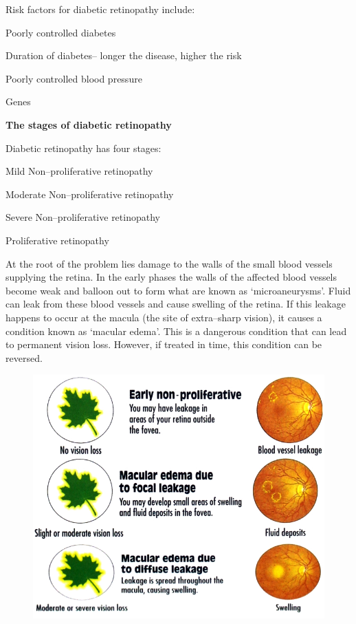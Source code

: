 {Risk factors for diabetic retinopathy include:

\item Poorly controlled diabetes

 \item Duration of diabetes– longer the disease, higher the risk

 \item Poorly controlled blood pressure

 \item Genes

\textbf{The stages of diabetic retinopathy}

Diabetic retinopathy has four stages:

\item Mild Non–proliferative retinopathy

 \item Moderate Non–proliferative retinopathy

 \item Severe Non–proliferative retinopathy

 \item Proliferative retinopathy

At the root of the problem lies damage to the walls of the small blood vessels supplying the retina. In the early phases the walls of the affected blood vessels become weak and balloon out to form what are known as ‘microaneurysms’. Fluid can leak from these blood vessels and cause swelling of the retina. If this leakage happens to occur at the macula (the site of extra–sharp vision), it causes a condition known as ‘macular edema’. This is a dangerous condition that can lead to permanent vision loss. However, if treated in time, this condition can be reversed.

\begin{figure}
\caption{}
\includegraphics{images/054.jpg}
\end{figure}

}
